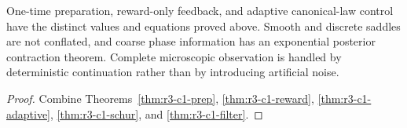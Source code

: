 \begin{theorem}
\label{thm:r3-c1-main}
One-time preparation, reward-only feedback, and adaptive canonical-law control
have the distinct values and equations proved above.  Smooth and discrete
saddles are not conflated, and coarse phase information has an exponential
posterior contraction theorem.  Complete microscopic observation is handled
by deterministic continuation rather than by introducing artificial noise.
\end{theorem}

\begin{proof}
Combine Theorems~\ref{thm:r3-c1-prep},
\ref{thm:r3-c1-reward}, \ref{thm:r3-c1-adaptive},
\ref{thm:r3-c1-schur}, and \ref{thm:r3-c1-filter}.
\end{proof}
